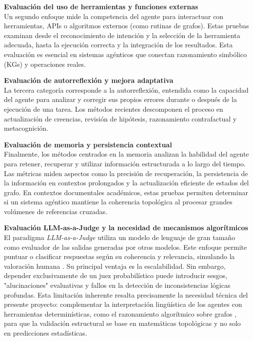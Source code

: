 \documentclass[12pt,letterpaper]{article}
\begin{document}
\textbf{Evaluación del uso de herramientas y funciones externas}\\
Un segundo enfoque mide la competencia del agente para interactuar con herramientas, APIs o algoritmos externos (como rutinas de grafos). Estas pruebas examinan desde el reconocimiento de intención y la selección de la herramienta adecuada, hasta la ejecución correcta y la integración de los resultados. Esta evaluación es esencial en sistemas agénticos que conectan razonamiento simbólico (KGs) y operaciones reales.

\textbf{Evaluación de autorreflexión y mejora adaptativa}\\
La tercera categoría corresponde a la autorreflexión, entendida como la capacidad del agente para analizar y corregir sus propios errores durante o después de la ejecución de una tarea. Los métodos recientes descomponen el proceso en actualización de creencias, revisión de hipótesis, razonamiento contrafactual y metacognición.

\textbf{Evaluación de memoria y persistencia contextual}\\
Finalmente, los métodos centrados en la memoria analizan la habilidad del agente para retener, recuperar y utilizar información estructurada a lo largo del tiempo. Las métricas miden aspectos como la precisión de recuperación, la persistencia de la información en contextos prolongados y la actualización eficiente de estados del grafo. En contextos documentales académicos, estas pruebas permiten determinar si un sistema agéntico mantiene la coherencia topológica al procesar grandes volúmenes de referencias cruzadas.

\vspace{0.3cm}
\textbf{Evaluación LLM-as-a-Judge y la necesidad de mecanismos algorítmicos}\\
El paradigma \textit{LLM-as-a-Judge} utiliza un modelo de lenguaje de gran tamaño como evaluador de las salidas generadas por otros modelos. Este enfoque permite puntuar o clasificar respuestas según su coherencia y relevancia, simulando la valoración humana \citep{judge}. Su principal ventaja es la escalabilidad. Sin embargo, depender exclusivamente de un juez probabilístico puede introducir sesgos, "alucinaciones" evaluativas y fallos en la detección de inconsistencias lógicas profundas. Esta limitación inherente resalta precisamente la necesidad técnica del presente proyecto: complementar la interpretación lingüística de los agentes con herramientas determinísticas, como el razonamiento algorítmico sobre grafos , para que la validación estructural se base en matemáticas topológicas y no solo en predicciones estadísticas.
\newpage
\end{document}
